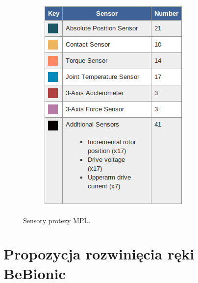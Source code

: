 \documentclass[8pt]{beamer}
\begin{document}
\begin{frame}
\begin{figure}
\begin{center}
\begin{subfigure}[b]{0.4\textwidth}
                		\includegraphics[width=\textwidth]{graphics/mpl_opis.png}
                		\label{graph:g6}
        			\end{subfigure}%
				\end{center}
				\caption{Sensory protezy MPL.}
			\end{figure}
		\end{frame}				
%
	
		
	
\section{Propozycja rozwinięcia ręki BeBionic}
	
\end{document}
